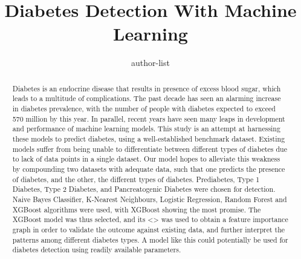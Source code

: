 \documentclass{article}
\title{Diabetes Detection With Machine Learning}
\author{author-list}
\begin{document}
\maketitle

\begin{abstract}
Diabetes is an endocrine disease that results in presence of excess blood sugar, which leads to a multitude of complications. The past decade has seen an alarming increase in diabetes prevalence, with the number of people with diabetes expected to exceed 570 million by this year. 
In parallel, recent years have seen many leaps in development and performance of machine learning models. This study is an attempt at harnessing these models to predict diabetes, using a well-established benchmark dataset.
Existing models suffer from being unable to differentiate between different types of diabetes due to lack of data points in a single dataset. Our model hopes to alleviate this weakness by compounding two datasets with adequate data, such that one predicts the presence of diabetes, and the other, the different types of diabetes. Prediabetes, Type 1 Diabetes, Type 2 Diabetes, and Pancreatogenic Diabetes were chosen for detection.
Naive Bayes Classifier, K-Nearest Neighbours, Logistic Regression, Random Forest and XGBoost algorithms were used, with XGBoost showing the most promise.
The XGBoost model was thus selected, and its <> was used to obtain a feature importance graph in order to validate the outcome against existing data, and further interpret the patterns among different diabetes types.
A model like this could potentially be used for diabetes detection using readily available parameters.
\end{abstract}
\end{document}
